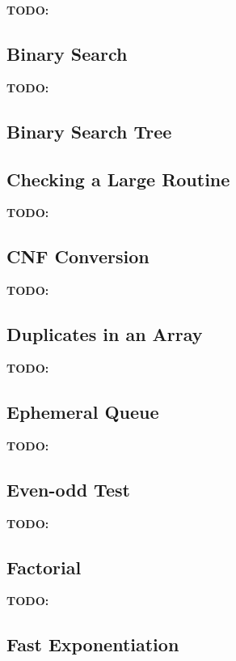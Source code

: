 \documentclass{llncs}
\newcommand{\todo}[1]{\textbf{TODO:}#1}
\begin{document}
\todo

\subsection{Binary Search}
\label{sec:binary-search}

\todo

\subsection{Binary Search Tree}
\label{sec:binary-search-tree}



\subsection{Checking a Large Routine}
\label{sec:check-large-rout}

\todo

\subsection{CNF Conversion}
\label{sec:cnf-conversion}

\todo

\subsection{Duplicates in an Array}
\label{sec:duplicates-an-array}

\todo

\subsection{Ephemeral Queue}
\label{sec:ephemeral-queue}

\todo

\subsection{Even-odd Test}
\label{sec:even-odd-test}

\todo

\subsection{Factorial}
\label{sec:factorial}

\todo

\subsection{Fast Exponentiation}
\label{sec:fast-exponentiation}
\end{document}
